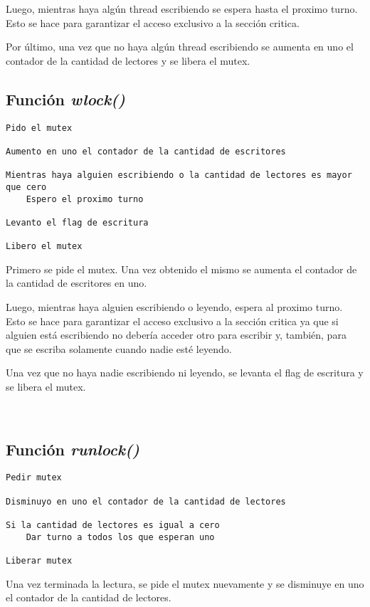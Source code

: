 Luego, mientras haya algún thread escribiendo se espera hasta el proximo turno. Esto se hace para garantizar el acceso exclusivo a la sección critica.

Por último, una vez que no haya algún thread escribiendo se aumenta en uno el contador de la cantidad de lectores y se libera el mutex.

\newpage

\subsection{Función \textit{wlock()}}

\begin{lstlisting}
Pido el mutex

Aumento en uno el contador de la cantidad de escritores

Mientras haya alguien escribiendo o la cantidad de lectores es mayor que cero
	Espero el proximo turno

Levanto el flag de escritura

Libero el mutex
\end{lstlisting}

Primero se pide el mutex. Una vez obtenido el mismo se aumenta el contador de la cantidad de escritores en uno.

Luego, mientras haya alguien escribiendo o leyendo, espera al proximo turno. Esto se hace para garantizar el acceso exclusivo a la sección critica ya que si alguien está escribiendo no debería acceder otro para escribir y, también, para que se escriba solamente cuando nadie esté leyendo.

Una vez que no haya nadie escribiendo ni leyendo, se levanta el flag de escritura y se libera el mutex.

~
\subsection{Función \textit{runlock()}}

\begin{lstlisting}
Pedir mutex

Disminuyo en uno el contador de la cantidad de lectores

Si la cantidad de lectores es igual a cero
	Dar turno a todos los que esperan uno

Liberar mutex
\end{lstlisting}

Una vez terminada la lectura, se pide el mutex nuevamente y se disminuye en uno el contador de la cantidad de lectores.

